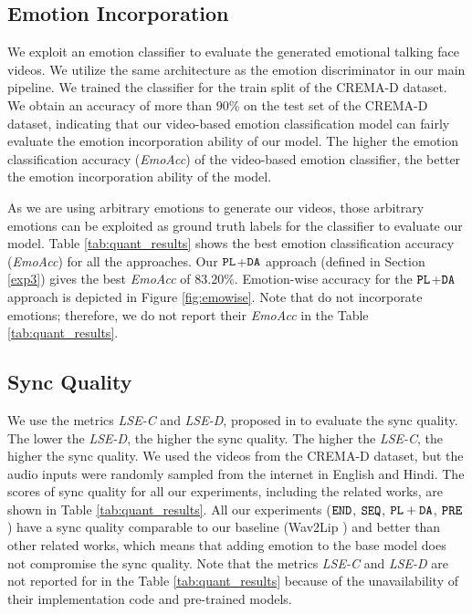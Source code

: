 \documentclass[accepted]{uai2023}
\begin{document}
\subsection{Emotion Incorporation}
We exploit an emotion classifier to evaluate the generated emotional talking face videos. We utilize the same architecture as the emotion discriminator in our main pipeline. We trained the classifier for the train split of the CREMA-D \citep{cao2014crema} dataset. We obtain an accuracy of more than $90\%$ on the test set of the CREMA-D dataset, indicating that our video-based emotion classification model can fairly evaluate the emotion incorporation ability of our model. The higher the emotion classification accuracy (\emph{EmoAcc}) of the video-based emotion classifier, the better the emotion incorporation ability of the model.

As we are using arbitrary emotions to generate our videos, those arbitrary emotions can be exploited as ground truth labels for the classifier to evaluate our model. Table \ref{tab:quant_results} shows the best emotion classification accuracy (\emph{EmoAcc}) for all the approaches. Our ${\tt PL}$+${\tt DA}$ approach (defined in Section \ref{exp3}) gives the best \emph{EmoAcc} of $83.20\%$.
Emotion-wise accuracy for the ${\tt PL}$+${\tt DA}$ approach is depicted in Figure \ref{fig:emowise}. Note that \citep{prajwal2020lip, wang2021audio2head} do not incorporate emotions; therefore, we do not report their \emph{EmoAcc} in the Table \ref{tab:quant_results}.

\subsection{Sync Quality}
We use the metrics
\emph{LSE-C} and \emph{LSE-D}, proposed in \citep{prajwal2020lip} to evaluate the sync quality.
The lower the \emph{LSE-D}, the higher the sync quality. The higher the \emph{LSE-C}, the higher the sync quality.
We used the videos from the CREMA-D \citep{cao2014crema} dataset, but the audio inputs were randomly sampled from the internet in English and Hindi.
The scores of sync quality for all our experiments, including the related works, are shown in  Table \ref{tab:quant_results}. All our experiments ({${\tt END}$}, {${\tt SEQ}$}, {${\tt PL+DA}$}, {${\tt PRE}$}) have a sync quality comparable to our baseline (Wav2Lip \citep{prajwal2020lip}) and better than other related works, which means that adding emotion to the base model does not compromise the sync quality. Note that the metrics \emph{LSE-C} and \emph{LSE-D} are not reported for \citep{DBLP:journals/corr/abs-1906-06337, sinha2022emotion} in the Table \ref{tab:quant_results} because of the unavailability of their implementation code and pre-trained models.
\end{document}
